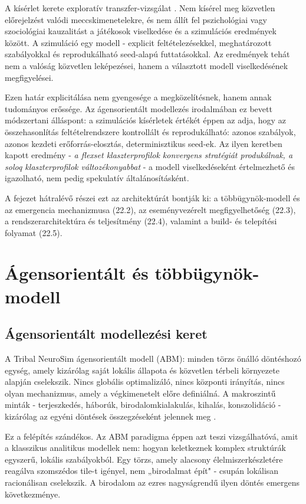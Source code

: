 A kísérlet kerete exploratív transzfer-vizsgálat \cite{bonabeau2002}.
Nem kísérel meg közvetlen előrejelzést valódi meccskimenetelekre, és nem állít fel
pszichológiai vagy szociológiai kauzalitást a játékosok viselkedése és a szimulációs eredmények között.
A szimuláció egy modell - explicit feltételezésekkel, meghatározott szabályokkal és reprodukálható
seed-alapú futtatásokkal. Az eredmények tehát nem a valóság közvetlen leképezései, hanem
a választott modell viselkedésének megfigyelései.

Ezen határ explicitálása nem gyengesége a megközelítésnek, hanem annak tudományos erőssége.
Az ágensorientált modellezés irodalmában ez bevett módszertani álláspont: a szimulációs kísérletek értékét
éppen az adja, hogy az összehasonlítás feltételrendszere kontrollált és reprodukálható: azonos
szabályok, azonos kezdeti erőforrás-elosztás, determinisztikus seed-ek.
Az ilyen keretben kapott eredmény - \textit{a flexset klaszterprofilok konvergens stratégiát produkálnak,
a soloq klaszterprofilok változékonyabbat} - a modell viselkedéseként értelmezhető és igazolható,
nem pedig spekulatív általánosításként.

A fejezet hátralévő részei ezt az architektúrát bontják ki: a többügynök-modell és az emergencia
mechanizmusa (22.2), az eseményvezérelt megfigyelhetőség (22.3), a rendszerarchitektúra és
teljesítmény (22.4), valamint a build- és telepítési folyamat (22.5).

\section{Ágensorientált és többügynök-modell}
\label{sec:neurosim-24-abm-mas}

\subsection*{Ágensorientált modellezési keret}

A Tribal NeuroSim ágensorientált modell (ABM): minden törzs önálló döntéshozó egység,
amely kizárólag saját lokális állapota és közvetlen térbeli környezete alapján cselekszik.
Nincs globális optimalizáló, nincs központi irányítás, nincs olyan mechanizmus,
amely a végkimenetelt előre definiálná. A makroszintű minták - terjeszkedés, háborúk,
birodalomkialakulás, kihalás, konszolidáció - kizárólag az egyéni döntések összegzéseként
jelennek meg \cite{bonabeau2002}.

Ez a felépítés szándékos. Az ABM paradigma éppen azt teszi vizsgálhatóvá,
amit a klasszikus analitikus modellek nem: hogyan keletkeznek komplex struktúrák
egyszerű, lokális szabályokból. Egy törzs, amely alacsony élelmiszerkészletére reagálva
szomszédos tile-t igényel, nem „birodalmat épít" - csupán lokálisan racionálisan cselekszik.
A birodalom az ezres nagyságrendű ilyen döntés emergens következménye.

